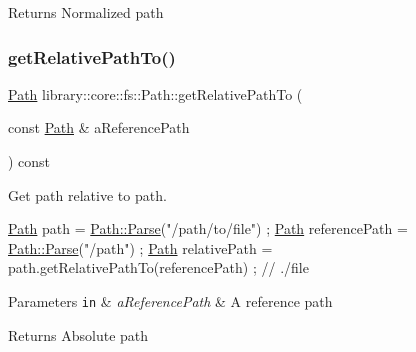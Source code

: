 \begin{DoxyReturn}{Returns}
Normalized path 
\end{DoxyReturn}
\mbox{\label{classlibrary_1_1core_1_1fs_1_1_path_a8f24340e887cfbfe675e96c0ba92321f}} 
\subsubsection{\texorpdfstring{get\+Relative\+Path\+To()}{getRelativePathTo()}}
{\footnotesize\ttfamily \hyperlink{classlibrary_1_1core_1_1fs_1_1_path}{Path} library\+::core\+::fs\+::\+Path\+::get\+Relative\+Path\+To (\begin{DoxyParamCaption}\item[{const \hyperlink{classlibrary_1_1core_1_1fs_1_1_path}{Path} \&}]{a\+Reference\+Path }\end{DoxyParamCaption}) const}



Get path relative to path. 


\begin{DoxyCode}
\hyperlink{classlibrary_1_1core_1_1fs_1_1_path_aaba9a8e0153813f08f78f1c3275734a4}{Path} path = \hyperlink{classlibrary_1_1core_1_1fs_1_1_path_aebf5bd3af83e0b7376616e146f3e55df}{Path::Parse}(\textcolor{stringliteral}{"/path/to/file"}) ;
\hyperlink{classlibrary_1_1core_1_1fs_1_1_path_aaba9a8e0153813f08f78f1c3275734a4}{Path} referencePath = \hyperlink{classlibrary_1_1core_1_1fs_1_1_path_aebf5bd3af83e0b7376616e146f3e55df}{Path::Parse}(\textcolor{stringliteral}{"/path"}) ;
\hyperlink{classlibrary_1_1core_1_1fs_1_1_path_aaba9a8e0153813f08f78f1c3275734a4}{Path} relativePath = path.getRelativePathTo(referencePath) ; \textcolor{comment}{// ./file}
\end{DoxyCode}



\begin{DoxyParams}[1]{Parameters}
\mbox{\tt in}  & {\em a\+Reference\+Path} & A reference path \\
\hline
\end{DoxyParams}
\begin{DoxyReturn}{Returns}
Absolute path 
\end{DoxyReturn}
\mbox{\label{classlibrary_1_1core_1_1fs_1_1_path_a9a5772dfc1273a74137ca301e9a84d61}} 
